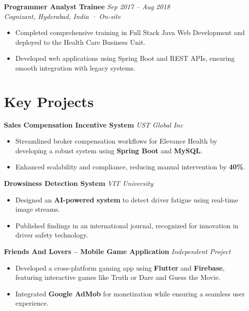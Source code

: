 \documentclass[a4paper,10pt]{article}
\begin{document}
\noindent\textbf{Programmer Analyst Trainee} \hfill \textit{Sep 2017 -- Aug 2018} \\
\textit{Cognizant, Hyderabad, India · On-site} \\
\vspace{-0.4cm}
\begin{itemize}[leftmargin=0.5cm, labelsep=0.3cm, itemsep=0.2em, parsep=0pt, topsep=0pt]
    \item Completed comprehensive training in Full Stack Java Web Development and deployed to the Health Care Business Unit.
    \item Developed web applications using Spring Boot and REST APIs, ensuring smooth integration with legacy systems.
\end{itemize}


\section*{Key Projects}

\noindent\textbf{Sales Compensation Incentive System} \hfill \textit{UST Global Inc} \\
\vspace{-0.5em}
\begin{itemize}[leftmargin=0.5cm, labelsep=0.3cm, itemsep=0pt, parsep=0pt, topsep=0pt]
    \item Streamlined broker compensation workflows for Elevance Health by developing a robust system using \textbf{Spring Boot} and \textbf{MySQL}.
    \item Enhanced scalability and compliance, reducing manual intervention by \textbf{40\%}.
\end{itemize}

\noindent\textbf{Drowsiness Detection System} \hfill \textit{VIT University} \\
\vspace{-0.5em}
\begin{itemize}[leftmargin=0.5cm, labelsep=0.3cm, itemsep=0pt, parsep=0pt, topsep=0pt]
    \item Designed an \textbf{AI-powered system} to detect driver fatigue using real-time image streams.
    \item Published findings in an international journal, recognized for innovation in driver safety technology.
\end{itemize}

\noindent\textbf{Friends And Lovers – Mobile Game Application} \hfill \textit{Independent Project} \\
\vspace{-0.5em}
\begin{itemize}[leftmargin=0.5cm, labelsep=0.3cm, itemsep=0pt, parsep=0pt, topsep=0pt]
    \item Developed a cross-platform gaming app using \textbf{Flutter} and \textbf{Firebase}, featuring interactive games like Truth or Dare and Guess the Movie.
    \item Integrated \textbf{Google AdMob} for monetization while ensuring a seamless user experience.
\end{itemize}
\end{document}

